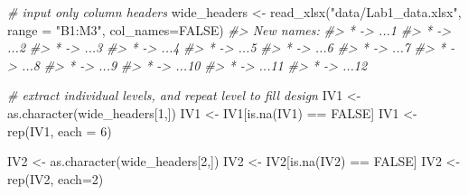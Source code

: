 \documentclass[
]{book}
\newenvironment{Shaded}{\begin{snugshade}}{\end{snugshade}}
\newcommand{\AttributeTok}[1]{\textcolor[rgb]{0.77,0.63,0.00}{#1}}
\newcommand{\CommentTok}[1]{\textcolor[rgb]{0.56,0.35,0.01}{\textit{#1}}}
\newcommand{\ConstantTok}[1]{\textcolor[rgb]{0.00,0.00,0.00}{#1}}
\newcommand{\DecValTok}[1]{\textcolor[rgb]{0.00,0.00,0.81}{#1}}
\newcommand{\FunctionTok}[1]{\textcolor[rgb]{0.00,0.00,0.00}{#1}}
\newcommand{\NormalTok}[1]{#1}
\newcommand{\OtherTok}[1]{\textcolor[rgb]{0.56,0.35,0.01}{#1}}
\newcommand{\SpecialCharTok}[1]{\textcolor[rgb]{0.00,0.00,0.00}{#1}}
\newcommand{\StringTok}[1]{\textcolor[rgb]{0.31,0.60,0.02}{#1}}
\theoremstyle{definition}
\theoremstyle{definition}
\theoremstyle{definition}
\theoremstyle{definition}
\theoremstyle{remark}
\begin{document}
\begin{Shaded}
\begin{Highlighting}[]
\CommentTok{\# input only column headers}
\NormalTok{wide\_headers }\OtherTok{\textless{}{-}} \FunctionTok{read\_xlsx}\NormalTok{(}\StringTok{"data/Lab1\_data.xlsx"}\NormalTok{,}
                          \AttributeTok{range =} \StringTok{"B1:M3"}\NormalTok{, }
                          \AttributeTok{col\_names=}\ConstantTok{FALSE}\NormalTok{)}
\CommentTok{\#\textgreater{} New names:}
\CommentTok{\#\textgreater{} * \textasciigrave{}\textasciigrave{} {-}\textgreater{} \textasciigrave{}...1\textasciigrave{}}
\CommentTok{\#\textgreater{} * \textasciigrave{}\textasciigrave{} {-}\textgreater{} \textasciigrave{}...2\textasciigrave{}}
\CommentTok{\#\textgreater{} * \textasciigrave{}\textasciigrave{} {-}\textgreater{} \textasciigrave{}...3\textasciigrave{}}
\CommentTok{\#\textgreater{} * \textasciigrave{}\textasciigrave{} {-}\textgreater{} \textasciigrave{}...4\textasciigrave{}}
\CommentTok{\#\textgreater{} * \textasciigrave{}\textasciigrave{} {-}\textgreater{} \textasciigrave{}...5\textasciigrave{}}
\CommentTok{\#\textgreater{} * \textasciigrave{}\textasciigrave{} {-}\textgreater{} \textasciigrave{}...6\textasciigrave{}}
\CommentTok{\#\textgreater{} * \textasciigrave{}\textasciigrave{} {-}\textgreater{} \textasciigrave{}...7\textasciigrave{}}
\CommentTok{\#\textgreater{} * \textasciigrave{}\textasciigrave{} {-}\textgreater{} \textasciigrave{}...8\textasciigrave{}}
\CommentTok{\#\textgreater{} * \textasciigrave{}\textasciigrave{} {-}\textgreater{} \textasciigrave{}...9\textasciigrave{}}
\CommentTok{\#\textgreater{} * \textasciigrave{}\textasciigrave{} {-}\textgreater{} \textasciigrave{}...10\textasciigrave{}}
\CommentTok{\#\textgreater{} * \textasciigrave{}\textasciigrave{} {-}\textgreater{} \textasciigrave{}...11\textasciigrave{}}
\CommentTok{\#\textgreater{} * \textasciigrave{}\textasciigrave{} {-}\textgreater{} \textasciigrave{}...12\textasciigrave{}}

\CommentTok{\# extract individual levels, and repeat level to fill design}
\NormalTok{IV1 }\OtherTok{\textless{}{-}} \FunctionTok{as.character}\NormalTok{(wide\_headers[}\DecValTok{1}\NormalTok{,])}
\NormalTok{IV1 }\OtherTok{\textless{}{-}}\NormalTok{ IV1[}\FunctionTok{is.na}\NormalTok{(IV1) }\SpecialCharTok{==} \ConstantTok{FALSE}\NormalTok{]}
\NormalTok{IV1 }\OtherTok{\textless{}{-}} \FunctionTok{rep}\NormalTok{(IV1, }\AttributeTok{each =} \DecValTok{6}\NormalTok{)}

\NormalTok{IV2 }\OtherTok{\textless{}{-}} \FunctionTok{as.character}\NormalTok{(wide\_headers[}\DecValTok{2}\NormalTok{,])}
\NormalTok{IV2 }\OtherTok{\textless{}{-}}\NormalTok{ IV2[}\FunctionTok{is.na}\NormalTok{(IV2) }\SpecialCharTok{==} \ConstantTok{FALSE}\NormalTok{]}
\NormalTok{IV2 }\OtherTok{\textless{}{-}} \FunctionTok{rep}\NormalTok{(IV2, }\AttributeTok{each=}\DecValTok{2}\NormalTok{)}


\end{Highlighting}
\end{Shaded}
\end{document}
